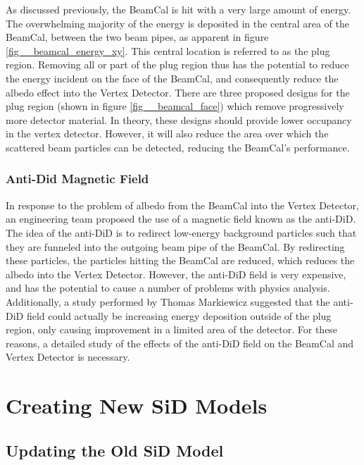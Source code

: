 \documentclass{report}
\begin{document}
                As discussed previously, the BeamCal is hit with a very large amount of energy. The overwhelming majority of the energy is deposited in the central area of the BeamCal, between the two beam pipes, as apparent in figure \ref{fig__beamcal_energy_xy}. This central location is referred to as the plug region. Removing all or part of the plug region thus has the potential to reduce the energy incident on the face of the BeamCal, and consequently reduce the albedo effect into the Vertex Detector. There are three proposed designs for the plug region (shown in figure \ref{fig__beamcal_face}) which remove progressively more detector material. In theory, these designs should provide lower occupancy in the vertex detector. However, it will also reduce the area over which the scattered beam particles can be detected, reducing the BeamCal's performance.


            \subsection{Anti-Did Magnetic Field}
                In response to the problem of albedo from the BeamCal into the Vertex Detector, an engineering team proposed the use of a magnetic field known as the anti-DiD. The idea of the anti-DiD is to redirect low-energy background particles such that they are funneled into the outgoing beam pipe of the BeamCal. By redirecting these particles, the particles hitting the BeamCal are reduced, which reduces the albedo into the Vertex Detector. However, the anti-DiD field is very expensive, and has the potential to cause a number of problems with physics analysis. Additionally, a study performed by Thomas Markiewicz \cite{anti-did} suggested that the anti-DiD field could actually be increasing energy deposition outside of the plug region, only causing improvement in a limited area of the detector. For these reasons, a detailed study of the effects of the anti-DiD field on the BeamCal and Vertex Detector is necessary.





    \chapter{Creating New SiD Models}
        \section{Updating the Old SiD Model}
            
\end{document}
